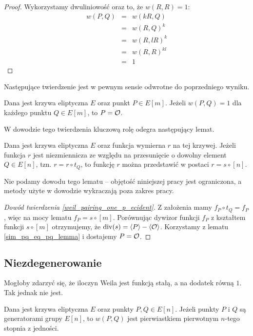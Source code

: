\begin{proof}
Wykorzystamy dwuliniowość oraz to, że $w(R, R) = 1$:
\begin{eqnarray*}
w(P, Q)
& = & w(kR, Q) \\
& = & w(R, Q)^k \\
& = & w(R, lR)^k \\
& = & w(R, R)^{kl} \\
& = & 1
\end{eqnarray*}
\end{proof}

Następujące twierdzenie jest w pewnym sensie odwrotne do poprzedniego wyniku.

\begin{theorem}\label{weil_pairing_one_p_ecident}
Dana jest krzywa eliptyczna $E$ oraz punkt $P \in E[m]$.
Jeżeli $w(P, Q) = 1$ dla każdego punktu $Q \in E[m]$, to $P = \mathcal{O}$.
\end{theorem}

W dowodzie tego twierdzenia kluczową rolę odegra następujący lemat.

\begin{lemma}
Dana jest krzywa eliptyczna $E$ oraz funkcja wymierna $r$ na tej krzywej.
Jeżeli funkcja $r$ jest niezmiennicza ze względu na przesunięcie
o dowolny element $Q \in E[n]$, tzn. $r = r \circ t_Q$,
to funkcję $r$ można przedstawić w postaci $r = s \circ [n]$.
\end{lemma}

Nie podamy dowodu tego lematu -- objętość niniejszej pracy jest ograniczona,
a metody użyte w dowodzie wykraczają poza zakres pracy.

\begin{proof}[Dowód twierdzenia \ref{weil_pairing_one_p_ecident}]
Z założenia mamy $f_P \circ t_Q = f_P$,
więc na mocy lematu $f_P = s \circ [m]$.
Porównując dywizor funkcji $f_P$ z kształtem funkcji $s \circ [m]$
otrzymujemy, że $\operatorname{div}(s) = \left\langle P\right\rangle - \left\langle\mathcal{O}\right\rangle$.
Korzystamy z lematu \ref{sim_pq_eq_pq_lemma} i dostajemy $P = \mathcal{O}$.
\end{proof}

\subsection*{Niezdegenerowanie}

Mogłoby zdarzyć się, że iloczyn Weila jest funkcją stałą,
a na dodatek równą $1$. Tak jednak nie jest.

\begin{theorem}
Dana jest krzywa eliptyczna $E$ oraz punkty $P, Q \in E[n]$.
Jeżeli punkty $P$ i $Q$ są generatorami grupy $E[n]$,
to $w(P, Q)$ jest pierwiastkiem pierwotnym $n$-tego stopnia z jedności.
\end{theorem}

